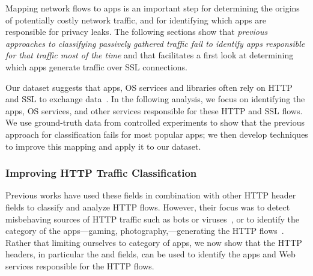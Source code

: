 Mapping network flows to apps is an important step for determining the origins of potentially costly 
network traffic, and for identifying which apps are responsible for privacy leaks. The following 
sections show that  \emph{previous approaches to classifying passively gathered traffic fail to identify
apps responsible for that traffic most of the time} and that \meddle facilitates a first look at 
determining which apps generate traffic over SSL connections.





Our \mobWild dataset suggests that apps, OS services and libraries often rely on HTTP and SSL to exchange data~\cite{maier:mobtraffic,falaki:mobileusage,xu:appusage}.
In the following analysis, we focus on identifying the apps, OS services, and other services responsible for these HTTP and SSL flows. 
We use ground-truth data from controlled experiments to show that the previous approach for classification fails 
for most popular apps; we then develop techniques to improve this mapping and apply it to our \mobWild dataset. 

\subsubsection{Improving HTTP Traffic Classification}

Previous works have used these fields in combination with other HTTP header fields to classify and analyze HTTP flows.
However, their focus was to detect misbehaving sources of HTTP traffic such as bots or viruses~\cite{sommers:cellwifi, perdisci:malwaresig, yegneswaran:nemean}, or to identify the category of the apps---gaming, photography,\etc---generating the HTTP flows~\cite{maier:mobtraffic,xu:appusage,falaki:mobileusage,falaki:smartphoneusage}.
Rather that limiting ourselves to category of apps, we now show that the HTTP headers, in particular the \useragent and \httphost fields, can be used to identify the apps and Web services responsible for the HTTP flows.

